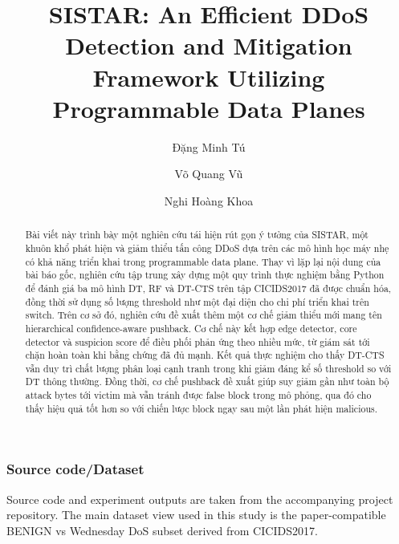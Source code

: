 \documentclass{llncs}
\begin{document}
%
\title{SISTAR: An Efficient DDoS Detection and Mitigation Framework Utilizing Programmable Data Planes}
%
%
\author{Đặng Minh Tú\and
Võ Quang Vũ \and
Nghi Hoàng Khoa}
%
%
%
\maketitle              %
\pagestyle{plain}
%
\begin{abstract}
Bài viết này trình bày một nghiên cứu tái hiện rút gọn ý tưởng của SISTAR, một khuôn khổ phát hiện và giảm thiểu tấn công DDoS dựa trên các mô hình học máy nhẹ có khả năng triển khai trong programmable data plane. Thay vì lặp lại nội dung của bài báo gốc, nghiên cứu tập trung xây dựng một quy trình thực nghiệm bằng Python để đánh giá ba mô hình DT, RF và DT-CTS trên tập CICIDS2017 đã được chuẩn hóa, đồng thời sử dụng số lượng threshold như một đại diện cho chi phí triển khai trên switch. Trên cơ sở đó, nghiên cứu đề xuất thêm một cơ chế giảm thiểu mới mang tên hierarchical confidence-aware pushback. Cơ chế này kết hợp edge detector, core detector và suspicion score để điều phối phản ứng theo nhiều mức, từ giám sát tới chặn hoàn toàn khi bằng chứng đã đủ mạnh. Kết quả thực nghiệm cho thấy DT-CTS vẫn duy trì chất lượng phân loại cạnh tranh trong khi giảm đáng kể số threshold so với DT thông thường. Đồng thời, cơ chế pushback đề xuất giúp suy giảm gần như toàn bộ attack bytes tới victim mà vẫn tránh được false block trong mô phỏng, qua đó cho thấy hiệu quả tốt hơn so với chiến lược block ngay sau một lần phát hiện malicious.

\end{abstract}
%
%
%








\begin{credits}
\subsubsection{Source code/Dataset} Source code and experiment outputs are taken from the accompanying project repository. The main dataset view used in this study is the paper-compatible BENIGN vs Wednesday DoS subset derived from CICIDS2017.
\end{credits}
\FloatBarrier
\clearpage
%
%
%


\end{document}
